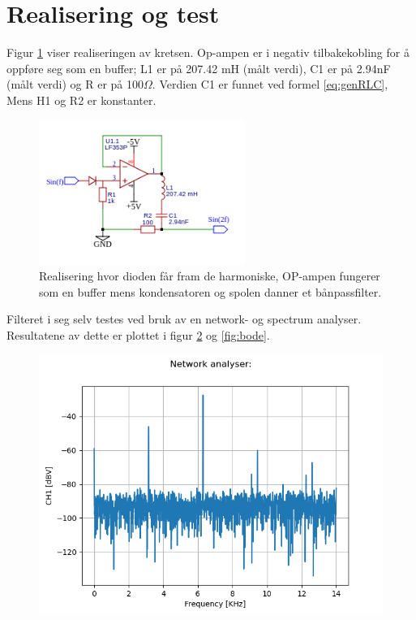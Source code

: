 \documentclass[a4paper,11pt,norsk]{article}
\begin{document}
\section{Realisering og test}
\label{sec:realisering}

Figur \ref{fig:Multiplikator} viser realiseringen av kretsen. Op-ampen er i negativ tilbakekobling for å oppføre seg som en buffer; L1 er på 207.42 mH (målt verdi), C1 er på 2.94nF (målt verdi) og R er på 100${\Omega}$. Verdien C1 er funnet ved formel \ref{eq:genRLC}, Mens H1 og R2 er konstanter.



\begin{figure}[H]
  \centering
  \includegraphics[width=0.6\textwidth]{SchematicCRKT.png} 
  \caption{Realisering hvor dioden får fram de harmoniske, OP-ampen fungerer som en buffer mens kondensatoren og spolen danner et bånpassfilter.}
  \label{fig:Multiplikator}
\end{figure}

Filteret i seg selv testes ved bruk av en network- og spectrum analyser. Resultatene av dette er plottet i figur \ref{fig:netwok} og \ref{fig:bode}.

\begin{figure}[H]
  \centering
  \includegraphics[width=1\textwidth]{network.png} 
  \caption{}
  \label{fig:netwok}
\end{figure}
\end{document}
